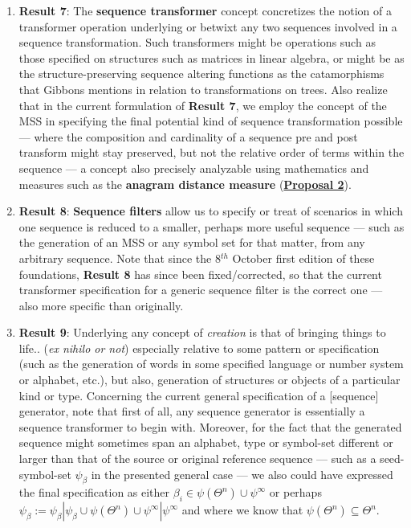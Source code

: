 \documentclass[a4paper, 18pt]{book} %
\begin{document}
{\begin{enumerate}
\item \textbf{Result 7}: The \textbf{sequence transformer} concept concretizes the notion of a transformer operation underlying or betwixt any two sequences involved in a sequence transformation. Such transformers might be operations such as those specified on structures such as matrices in linear algebra, or might be as the structure-preserving sequence altering functions as the catamorphisms that Gibbons mentions in relation to transformations on trees\cite{treealgebras_review}. Also realize that in the current formulation of \textbf{Result 7}, we employ the concept of the MSS in specifying the final potential kind of sequence transformation possible --- where the composition and cardinality of a sequence pre and post transform might stay preserved, but not the relative order of terms within the sequence --- a concept also precisely analyzable using mathematics and measures such as the \textbf{anagram distance measure} (\textbf{\hyperref[PROP2]{Proposal 2}}).
\item \textbf{Result 8}: \textbf{Sequence filters} allow us to specify or treat of scenarios in which one sequence is reduced to a smaller, perhaps more useful sequence --- such as the generation of an MSS or any symbol set for that matter, from any arbitrary sequence. Note that since the 8$^{th}$ October first edition of these foundations, \textbf{Result 8} has since been fixed/corrected, so that the current transformer specification for a generic sequence filter is the correct one --- also more specific than originally.
\item \textbf{Result 9}: Underlying any concept of \textit{creation} is that of bringing things to life.. (\textit{ex nihilo or not}) especially relative to some pattern or specification (such as the generation of words in some specified language or number system or alphabet, etc.), but also, generation of structures or objects of a particular kind or type. Concerning the current general specification of a [sequence] generator, note that first of all, any sequence generator is essentially a sequence transformer to begin with. Moreover, for the fact that the generated sequence might sometimes span an alphabet, type or symbol-set different or larger than that of the source or original reference sequence --- such as a seed-symbol-set $\psi_\beta$ in the presented general case --- we also could have expressed the final specification as either $\beta_i \in \psi(\Theta^n) \cup \psi^\infty$ or perhaps $\psi_\beta := \psi_\beta | \psi_\beta \cup \psi(\Theta^n) \cup \psi^\infty | \psi^\infty$ and where we know that $\psi(\Theta^n) \subseteq \Theta^n$.

\end{enumerate}}
\end{document}
